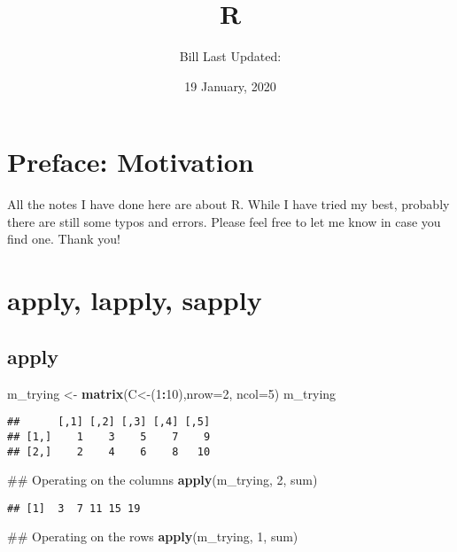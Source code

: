 \documentclass[]{book}
\title{R}
\author{Bill Last Updated:}
\date{19 January, 2020}
\newenvironment{Shaded}{\begin{snugshade}}{\end{snugshade}}
\newcommand{\KeywordTok}[1]{\textcolor[rgb]{0.13,0.29,0.53}{\textbf{#1}}}
\newcommand{\DataTypeTok}[1]{\textcolor[rgb]{0.13,0.29,0.53}{#1}}
\newcommand{\DecValTok}[1]{\textcolor[rgb]{0.00,0.00,0.81}{#1}}
\newcommand{\StringTok}[1]{\textcolor[rgb]{0.31,0.60,0.02}{#1}}
\newcommand{\OperatorTok}[1]{\textcolor[rgb]{0.81,0.36,0.00}{\textbf{#1}}}
\newcommand{\NormalTok}[1]{#1}
\begin{document}
\maketitle

{
\setcounter{tocdepth}{1}
\tableofcontents
}
\chapter*{Preface: Motivation}\label{my-section}

All the notes I have done here are about R. While I have tried my best,
probably there are still some typos and errors. Please feel free to let
me know in case you find one. Thank you!

\chapter{apply, lapply, sapply}\label{apply-lapply-sapply}

\section{apply}\label{apply}

\begin{Shaded}
\begin{Highlighting}[]
\NormalTok{m_trying <-}\StringTok{ }\KeywordTok{matrix}\NormalTok{(C<-(}\DecValTok{1}\OperatorTok{:}\DecValTok{10}\NormalTok{),}\DataTypeTok{nrow=}\DecValTok{2}\NormalTok{, }\DataTypeTok{ncol=}\DecValTok{5}\NormalTok{)}
\NormalTok{m_trying}
\end{Highlighting}
\end{Shaded}

\begin{verbatim}
##      [,1] [,2] [,3] [,4] [,5]
## [1,]    1    3    5    7    9
## [2,]    2    4    6    8   10
\end{verbatim}

\begin{Shaded}
\begin{Highlighting}[]
\NormalTok{## Operating on the columns}
\KeywordTok{apply}\NormalTok{(m_trying, }\DecValTok{2}\NormalTok{, sum)}
\end{Highlighting}
\end{Shaded}

\begin{verbatim}
## [1]  3  7 11 15 19
\end{verbatim}

\begin{Shaded}
\begin{Highlighting}[]
\NormalTok{## Operating on the rows}
\KeywordTok{apply}\NormalTok{(m_trying, }\DecValTok{1}\NormalTok{, sum)}
\end{Highlighting}
\end{Shaded}
\end{document}
